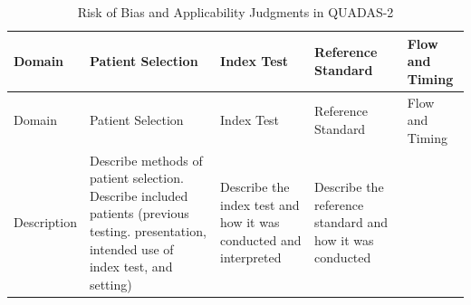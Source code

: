 \documentclass[
  11pt,
  a4paper,
  DIV=11,
  numbers=noendperiod]{scrreprt}
\begin{document}
\begin{longtable}[]{@{}
  >{\raggedright\arraybackslash}p{}
  >{\raggedright\arraybackslash}p{}
  >{\raggedright\arraybackslash}p{}
  >{\raggedright\arraybackslash}p{}
  >{\raggedright\arraybackslash}p{}@{}}
\caption{Risk of Bias and Applicability Judgments in
QUADAS-2}\label{tbl-quad}\tabularnewline
\toprule\noalign{}
\begin{minipage}[b]{\linewidth}\raggedright
Domain
\end{minipage} & \begin{minipage}[b]{\linewidth}\raggedright
Patient Selection
\end{minipage} & \begin{minipage}[b]{\linewidth}\raggedright
Index Test
\end{minipage} & \begin{minipage}[b]{\linewidth}\raggedright
Reference Standard
\end{minipage} & \begin{minipage}[b]{\linewidth}\raggedright
Flow and Timing
\end{minipage} \\
\midrule\noalign{}
\endfirsthead
\toprule\noalign{}
\begin{minipage}[b]{\linewidth}\raggedright
Domain
\end{minipage} & \begin{minipage}[b]{\linewidth}\raggedright
Patient Selection
\end{minipage} & \begin{minipage}[b]{\linewidth}\raggedright
Index Test
\end{minipage} & \begin{minipage}[b]{\linewidth}\raggedright
Reference Standard
\end{minipage} & \begin{minipage}[b]{\linewidth}\raggedright
Flow and Timing
\end{minipage} \\
\midrule\noalign{}
\endhead
\bottomrule\noalign{}
\endlastfoot
Description & Describe methods of patient selection. Describe included
patients (previous testing. presentation, intended use of index test,
and setting) & Describe the index test and how it was conducted and
interpreted & Describe the reference standard and how it was conducted

\end{longtable}
\end{document}
